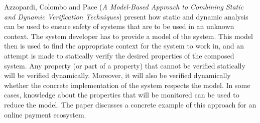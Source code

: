 

Azzopardi, Colombo and Pace \cite{isola-2016-azzopardi} ({\em A
Model-Based Approach to Combining Static and Dynamic Verification
Techniques}) present how static and dynamic analysis can be used to
ensure safety of systems that are to be used in an unknown
context. The system developer has to provide a model of the
system. This model then is used to find the appropriate context for the
system to work in, and an attempt is made to statically verify the
desired properties of the composed system. Any property (or part of a property)
that cannot be verified statically will be verified
dynamically. Moreover, it will also be verified dynamically whether
the concrete implementation of the system respects the
model. In some cases, knowledge about the properties that
will be monitored can be used to reduce the model. The paper discusses
a concrete example of this approach for an online payment ecosystem.
